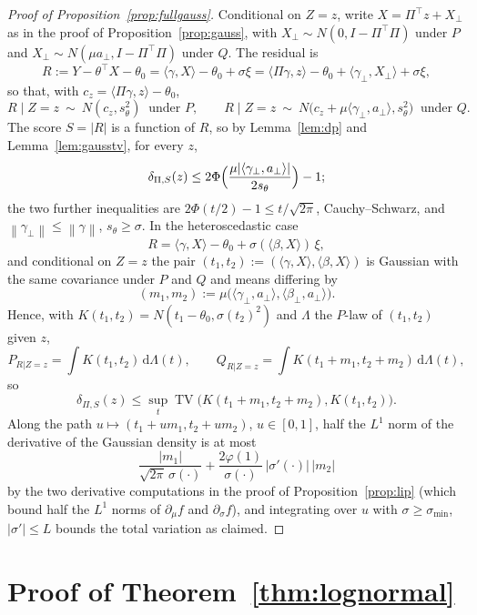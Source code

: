 \documentclass[11pt,a4paper]{article}
\newcommand{\norm}[1]{\left\|#1\right\|}
\newcommand{\TV}{\operatorname{TV}}
\theoremstyle{plain}
\theoremstyle{definition}
\theoremstyle{remark}
\begin{document}
\begin{proof}[Proof of Proposition~\ref{prop:fullgauss}]
Conditional on $Z=z$, write $X=\Pi^{\!\top}z+X_\perp$ as in the proof of Proposition~\ref{prop:gauss}, with $X_\perp\sim N(0,I-\Pi^{\!\top}\Pi)$ under $P$ and $X_\perp\sim N(\mu a_\perp,I-\Pi^{\!\top}\Pi)$ under $Q$. The residual is
\[
R:=Y-\theta^{\!\top}X-\theta_0=\langle\gamma,X\rangle-\theta_0+\sigma\xi=\langle\Pi\gamma,z\rangle-\theta_0+\langle\gamma_\perp,X_\perp\rangle+\sigma\xi,
\]
so that, with $c_z=\langle\Pi\gamma,z\rangle-\theta_0$,
\[
R\mid Z=z\ \sim\ N(c_z,s_\theta^2)\ \text{ under }P,\qquad
R\mid Z=z\ \sim\ N\bigl(c_z+\mu\langle\gamma_\perp,a_\perp\rangle,s_\theta^2\bigr)\ \text{ under }Q.
\]
The score $S=|R|$ is a function of $R$, so by Lemma~\ref{lem:dp} and Lemma~\ref{lem:gausstv}, for every $z$,
\[
\delta_{\Pi,S}(z)\le2\Phi\Bigl(\frac{\mu|\langle\gamma_\perp,a_\perp\rangle|}{2s_\theta}\Bigr)-1;
\]
the two further inequalities are $2\Phi(t/2)-1\le t/\sqrt{2\pi}$, Cauchy--Schwarz, and $\norm{\gamma_\perp}\le\norm\gamma$, $s_\theta\ge\sigma$. In the heteroscedastic case
\[
R=\langle\gamma,X\rangle-\theta_0+\sigma(\langle\beta,X\rangle)\,\xi,
\]
and conditional on $Z=z$ the pair $(t_1,t_2):=(\langle\gamma,X\rangle,\langle\beta,X\rangle)$ is Gaussian with the same covariance under $P$ and $Q$ and means differing by
\[
(m_1,m_2):=\mu\bigl(\langle\gamma_\perp,a_\perp\rangle,\langle\beta_\perp,a_\perp\rangle\bigr).
\]
Hence, with $K(t_1,t_2)=N(t_1-\theta_0,\sigma(t_2)^2)$ and $\Lambda$ the $P$-law of $(t_1,t_2)$ given $z$,
\[
P_{R|Z=z}=\int K(t_1,t_2)\,\mathrm d\Lambda(t),\qquad Q_{R|Z=z}=\int K(t_1+m_1,t_2+m_2)\,\mathrm d\Lambda(t),
\]
so
\[
\delta_{\Pi,S}(z)\le\sup_{t}\TV\bigl(K(t_1+m_1,t_2+m_2),K(t_1,t_2)\bigr).
\]
Along the path $u\mapsto(t_1+um_1,t_2+um_2)$, $u\in[0,1]$, half the $L^1$ norm of the derivative of the Gaussian density is at most
\[
\frac{|m_1|}{\sqrt{2\pi}\,\sigma(\cdot)}+\frac{2\varphi(1)}{\sigma(\cdot)}\,|\sigma'(\cdot)|\,|m_2|
\]
by the two derivative computations in the proof of Proposition~\ref{prop:lip} (which bound half the $L^1$ norms of $\partial_\mu f$ and $\partial_\sigma f$), and integrating over $u$ with $\sigma\ge\sigma_{\min}$, $|\sigma'|\le L$ bounds the total variation as claimed.
\end{proof}

\section{Proof of Theorem~\ref{thm:lognormal}}\label{app:lognormal}
\end{document}
